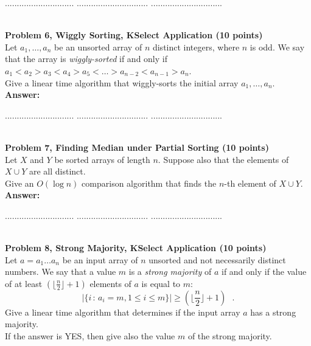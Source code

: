 \documentclass{article}
\begin{document}
\pagebreak
{} $.............................$
 $..............................$
          $..............................$

\noindent
{}\\

\noindent
{\bf Problem 6, Wiggly Sorting, KSelect Application (10 points)}\\
Let $a_1, \ldots , a_n$ be an unsorted  array of $n$ distinct integers, where $n$ is odd. 
We say that the array is {\em wiggly-sorted} if and only if
$
a_1 < a_2 > a_3 < a_4 > a_5 < \ldots  > a_{n-2} <a_{n-1}>a_n
$.\\
Give a linear time algorithm that wiggly-sorts the initial array $a_1, \ldots , a_n$.\\

\noindent
{\bf Answer:}

\pagebreak
{} $.............................$
 $..............................$
          $..............................$

\noindent
{}\\

\noindent
{\bf Problem 7, Finding Median under Partial Sorting (10 points)}\\
Let $X$ and $Y$ be sorted arrays of length $n$. 
Suppose also that the elements of $X\cup Y$ are all distinct.\\
Give an $O(\log n )$ comparison algorithm that finds the $n$-th element of $X\cup Y$.\\

\noindent
{\bf Answer:}

\pagebreak
{} $.............................$
 $..............................$
          $..............................$

\noindent
{}\\

\noindent
{\bf Problem 8,  Strong Majority, KSelect Application (10 points)}\\
Let $a=a_1 \ldots a_n$ be an input array of $n$ unsorted and not necessarily distinct numbers.
We say that a value $m$ is a {\em strong majority} of $a$ if and only if 
the value of at least $\left( \lfloor \frac{n}{2}  \rfloor + 1\right)$ elements of $a$ is equal to $m$:
$$
| \{ i \,:\, a_i=m ,  1\leq i \leq m   \}   | \geq \left( \lfloor \frac{n}{2}  \rfloor + 1  \right)~~~.
$$
Give a linear time algorithm that determines if the input array $a$ has a strong majority. \\
If the answer is YES, then give also the value $m$ of the strong majority.\\
\end{document}
